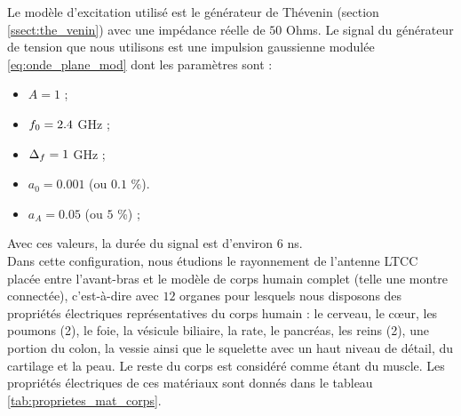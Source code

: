 Le modèle d'excitation utilisé est le générateur de Thévenin
(section \ref{ssect:the_venin}) avec une impédance réelle de $50$ Ohms.
Le signal du générateur de tension que nous utilisons est une impulsion gaussienne modulée
\eqref{eq:onde_plane_mod} dont les paramètres sont :
\begin{itemize}
	\item $A = 1$ ;
	\item $f_0 = 2.4$ GHz ;
	\item $\Delta_f = 1$ GHz ;
	\item $a_0 = 0.001$ (ou $0.1$ \%).
	\item $a_A = 0.05$ (ou $5$ \%) ;
\end{itemize}
Avec ces valeurs, la durée du signal est d'environ $6$ ns.
\\


Dans cette
configuration, nous étudions le rayonnement de l’antenne LTCC
placée entre l’avant-bras et le modèle de corps humain complet
(telle une montre connectée),
c’est-à-dire avec $12$ organes pour
lesquels nous disposons des propriétés électriques
représentatives du corps humain \cite{Gabriel1,1996Gabiel,2009Gabriel} :
le cerveau, le cœur, les poumons (2), le foie, la vésicule biliaire, la rate,
le pancréas, les reins (2), une portion du colon, la vessie
ainsi que le squelette avec un haut niveau de détail, du cartilage et la peau.
Le reste du corps est considéré comme étant du muscle.
Les propriétés électriques de ces matériaux sont donnés dans le tableau
\ref{tab:proprietes_mat_corps}.


